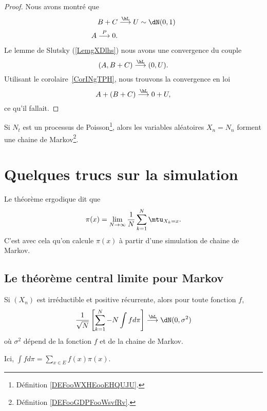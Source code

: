 \begin{proof}
	Nous avons montré que
	\begin{subequations}
		\begin{align}
			B+C & \stackrel{\hL}{\longrightarrow} U\sim\dN(0,1) \\
			A\stackrel{P}{\longrightarrow}0.
		\end{align}
	\end{subequations}
	Le lemme de Slutsky (\ref{LemgXDlhs}) nous avons une convergence du couple
	\begin{equation}
		(A,B+C)\stackrel{\hL}{\longrightarrow}(0,U).
	\end{equation}
	Utilisant le corolaire~\ref{CorINgTPH}, nous trouvons la convergence en loi
	\begin{equation}
		A+(B+C)\stackrel{\hL}{\longrightarrow}0+U,
	\end{equation}
	ce qu'il fallait.
\end{proof}

\begin{proposition}     \label{PROPooWAVPooHDVsER}
    Si \( N_t\) est un processus de Poisson\footnote{Définition \ref{DEFooWXHEooEHQUJU}.}, alors les variables aléatoires \( X_n=N_n\) forment une chaine de Markov\footnote{Définition \ref{DEFooGDPFooWsvfRv}.}.
\end{proposition}

\section{Quelques trucs sur la simulation}

Le théorème ergodique dit que
\begin{equation}
	\pi(x)=\lim_{N\to \infty} \frac{1}{ N }\sum_{k=1}^N\mtu_{X_k=x}.
\end{equation}
C'est avec cela qu'on calcule \( \pi(x)\) à partir d'une simulation de chaine de Markov.

\subsection{Le théorème central limite pour Markov}

\begin{theorem}
	Si \( (X_n)\) est irréductible et positive récurrente, alors pour toute fonction \( f\),
	\begin{equation}
		\frac{1}{ \sqrt{N} }\left[ \sum_{k=1}^N-N\int fd\pi \right]\stackrel{\hL}{\longrightarrow}\dN(0,\sigma^2)
	\end{equation}
	où \( \sigma^2\) dépend de la fonction \( f\) et de la chaine de Markov.

	Ici, \( \int fd\pi=\sum_{x\in E}f(x)\pi(x)\).
\end{theorem}

